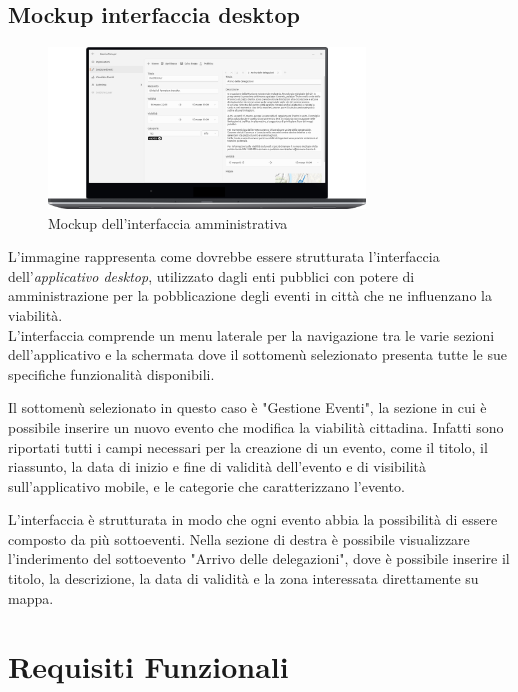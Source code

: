 \documentclass{article}
\begin{document}
\clearpage

\subsection{Mockup interfaccia desktop}
\begin{figure}[htbp]
    \label{4.2}
    \centering
    \includegraphics[width=0.75\textwidth]{Images/Mockup1 - Desktop.png}
    \caption{Mockup dell'interfaccia amministrativa}
\end{figure}

L'immagine rappresenta come dovrebbe essere strutturata l'interfaccia dell'\textit{applicativo desktop}, utilizzato dagli enti pubblici con potere di amministrazione per la pobblicazione degli eventi in città che ne influenzano la viabilità.\\
L'interfaccia comprende un menu laterale per la navigazione tra le varie sezioni dell'applicativo e la schermata dove il sottomenù selezionato presenta tutte le sue specifiche funzionalità disponibili.

Il sottomenù selezionato in questo caso è "Gestione Eventi", la sezione in cui è possibile inserire un nuovo evento che modifica la viabilità cittadina. Infatti sono riportati tutti i campi necessari per la creazione di un evento, come il titolo, il riassunto, la data di inizio e fine di validità dell'evento e di visibilità sull'applicativo mobile, e le categorie che caratterizzano l'evento.

L'interfaccia è strutturata in modo che ogni evento abbia la possibilità di essere composto da più sottoeventi. Nella sezione di destra è possibile visualizzare l'inderimento del sottoevento "Arrivo delle delegazioni", dove è possibile inserire il titolo, la descrizione, la data di validità e la zona interessata direttamente su mappa.\\

\clearpage

\section{Requisiti Funzionali}
\end{document}
